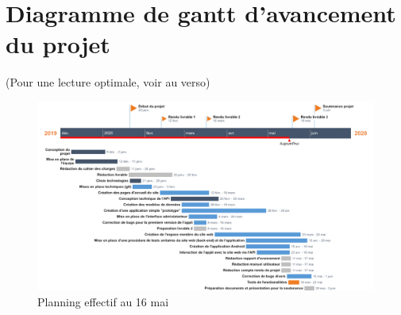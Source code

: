 \appendix


\listoffigures
\glsaddallunused
\printglossaries



\chapter{Diagramme de gantt d'avancement du projet}

(Pour une lecture optimale, voir au verso)

\begin{figure}
    \centering
    \includegraphics[keepaspectratio, width=\textwidth, height=\textheight]{ima/Planning-gantt}
    \caption{Planning effectif au 16 mai}
    \label{fig:91-Gantt}
\end{figure}


